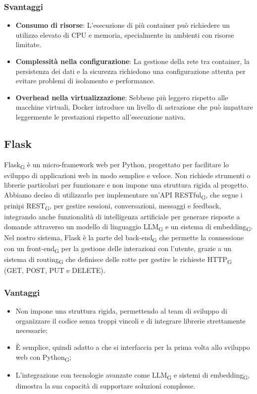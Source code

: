 \subsubsection{Svantaggi}
\begin{itemize}
    \item \textbf{Consumo di risorse}: L’esecuzione di più container può richiedere un utilizzo elevato di CPU e memoria, specialmente in ambienti con risorse limitate.
    \item \textbf{Complessità nella configurazione}: La gestione della rete tra container, la persistenza dei dati e la sicurezza richiedono una configurazione attenta per evitare problemi di isolamento e performance.
    \item \textbf{Overhead nella virtualizzazione}: Sebbene più leggero rispetto alle macchine virtuali, Docker introduce un livello di astrazione che può impattare leggermente le prestazioni rispetto all’esecuzione nativa.
\end{itemize}
\subsection{Flask}
Flask\textsubscript{G} è un micro-framework web per Python, progettato per facilitare lo sviluppo di applicazioni web in modo semplice e veloce. Non richiede strumenti o librerie particolari per funzionare e non impone una struttura rigida al progetto. Abbiamo deciso di utilizzarlo per implementare un'API RESTful\textsubscript{G}, che segue i prinipi REST\textsubscript{G}, per gestire sessioni, conversazioni, messaggi e feedback, integrando anche funzionalità di intelligenza artificiale per generare risposte a domande attraverso un modello di linguaggio LLM\textsubscript{G} e un sistema di embedding\textsubscript{G}. Nel nostro sistema, Flask è la parte del back-end\textsubscript{G} che permette la connessione con un front-end\textsubscript{G} per la gestione delle interazioni con l'utente, grazie a un sistema di routing\textsubscript{G} che definisce delle rotte per gestire le richieste HTTP\textsubscript{G} (GET, POST, PUT e DELETE). 
\subsubsection{Vantaggi}
\begin{itemize}
    \item Non impone una struttura rigida, permettendo al team di sviluppo di organizzare il codice senza troppi vincoli e di integrare librerie strettamente necessarie;
    \item È semplice, quindi adatto a che si interfaccia per la prima volta allo sviluppo web con Python\textsubscript{G};
    \item L'integrazione con tecnologie avanzate come LLM\textsubscript{G} e sistemi di embedding\textsubscript{G}, dimostra la sua capacità di supportare soluzioni complesse.
\end{itemize}
